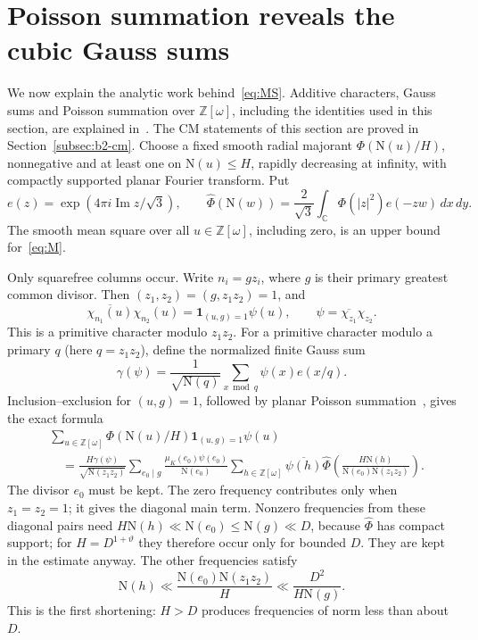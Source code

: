 \documentclass[11pt]{article}
\numberwithin{equation}{section}
\newcommand{\OO}{\mathbb Z[\omega]}
\newcommand{\N}{\mathrm N}
\newcommand{\muk}{\mu_K}
\newcommand{\ind}{\mathbf1}
\begin{document}
\section{Poisson summation reveals the cubic Gauss sums}\label{sec:poisson}

We now explain the analytic work behind~\eqref{eq:MS}. Additive characters, Gauss sums and
Poisson summation over $\OO$, including the identities used in this section, are explained
in~\cite[Section~4]{QF}. The CM statements of this section are proved in
Section~\ref{subsec:b2-cm}.
Choose a fixed smooth radial majorant $\Phi(\N(u)/H)$, nonnegative and
at least one on $\N(u)\le H$, rapidly decreasing at infinity, with
compactly supported planar Fourier transform. Put
\begin{equation}\label{eq:d032}
 e(z)=\exp(4\pi i\operatorname{Im}z/\sqrt3),\qquad
 \widehat\Phi(\N(w))=\frac2{\sqrt3}\int_{\mathbb C}
                         \Phi(|z|^2)e(-zw)\,dx\,dy.
\end{equation}
The smooth mean square over all $u\in\OO$, including zero, is an upper
bound for~\eqref{eq:M}.

Only squarefree columns occur. Write $n_i=gz_i$, where $g$ is their
primary greatest common divisor. Then $(z_1,z_2)=(g,z_1z_2)=1$, and
\begin{equation}\label{eq:d033}
 \overline{\chi_{n_1}(u)}\chi_{n_2}(u)
 =\ind_{(u,g)=1}\psi(u),\qquad
 \psi=\overline{\chi_{z_1}}\chi_{z_2}.
\end{equation}
This is a primitive character modulo $z_1z_2$. For a primitive character
modulo a primary $q$ (here $q=z_1z_2$), define the normalized finite Gauss sum
\begin{equation}\label{eq:d034}
 \gamma(\psi)=\frac1{\sqrt{\N(q)}}\sum_{x\bmod q}\psi(x)e(x/q).
\end{equation}
Inclusion--exclusion for $(u,g)=1$, followed by planar Poisson summation~\cite[Chapter~4]{IK04},
gives the exact formula~\cite[Lemma~4.2]{OAI1112}
\begin{equation}\label{eq:poisson-exact}
\begin{split}
 &\sum_{u\in\OO}\Phi(\N(u)/H)\ind_{(u,g)=1}\psi(u)\\
 &\quad=\frac{H\gamma(\psi)}{\sqrt{\N(z_1z_2)}}
 \sum_{e_0\mid g}\frac{\muk(e_0)\psi(e_0)}{\N(e_0)}
 \sum_{h\in\OO}\overline{\psi(h)}
 \widehat\Phi\left(\frac{H\N(h)}{\N(e_0)\N(z_1z_2)}\right).
\end{split}
\end{equation}
The divisor $e_0$ must be kept. The zero frequency contributes only when
$z_1=z_2=1$; it gives the diagonal main term. Nonzero frequencies from these
diagonal pairs need $H\N(h)\ll\N(e_0)\le\N(g)\ll D$, because $\widehat\Phi$ has compact
support; for $H=D^{1+\vartheta}$ they therefore occur only for bounded $D$. They are
kept in the estimate anyway.
The other frequencies satisfy
\begin{equation}\label{eq:d035}
 \N(h)\ll\frac{\N(e_0)\N(z_1z_2)}H
          \ll\frac{D^2}{H\N(g)}.
\end{equation}
This is the first shortening: $H>D$ produces frequencies of norm less
than about $D$.
\end{document}
